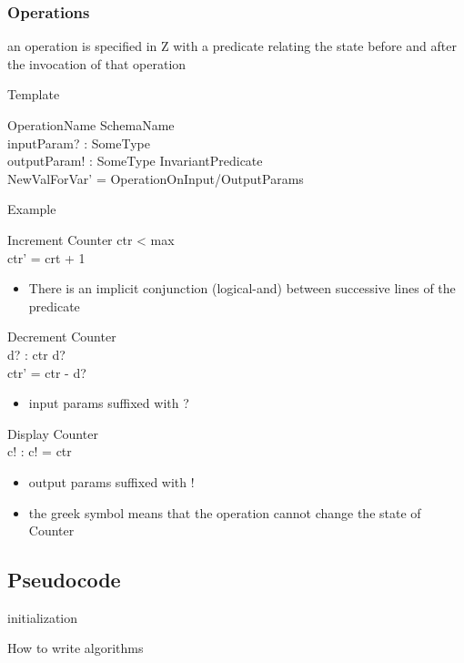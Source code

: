 \documentclass{article}
\begin{document}
\subsubsection{Operations}
an operation is specified in Z with a predicate relating the state before and after the invocation of that operation
\begin{paragraph}{Template}
  \begin{schema}{OperationName}
    \Delta SchemaName \\
    inputParam? : SomeType \\
    outputParam! : SomeType
    \where
    InvariantPredicate \\
    NewValForVar' = OperationOnInput/OutputParams
  \end{schema}
\end{paragraph}
\begin{paragraph}{Example}
  \begin{schema}{Increment}
    \Delta Counter
    \where
    ctr < max \\
    ctr' = crt + 1
  \end{schema}
  \begin{itemize}
    \item There is an implicit conjunction (logical-and) between successive lines of the predicate
    \end{itemize}
    \begin{schema}{Decrement}
      \Delta Counter \\
      d? : \nat
      \where
      ctr \geq d? \\
      ctr' = ctr - d?
    \end{schema}
    \begin{itemize}
    \item input params suffixed with ?
    \end{itemize}
    \begin{schema}{Display}
      \Xi Counter \\
      c! : \nat
      \where
      c! = ctr
    \end{schema}
    \begin{itemize}
    \item output params suffixed with !
    \item the greek symbol means that the operation cannot change the state of Counter
    \end{itemize}
  \end{paragraph}
  \subsection{Pseudocode}
  \begin{algorithm}[H]
    \SetAlgoLined
    initialization\;
    \caption{How to write algorithms}
  \end{algorithm}
\end{document}
